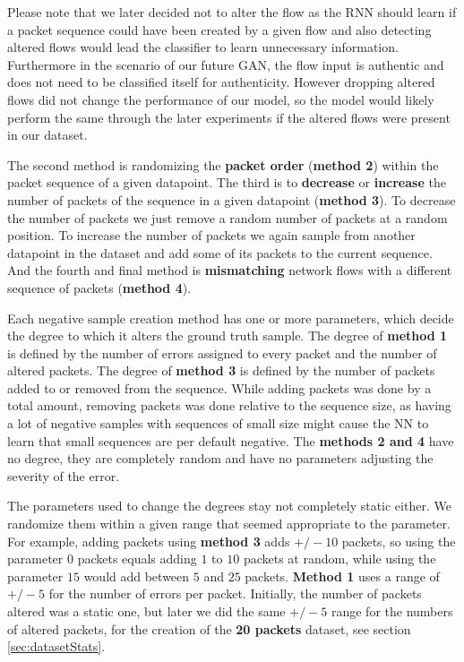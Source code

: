 \documentclass[
	ngerman,
	ruledheaders=section,%
	class=report,%
	thesis={type=bachelor},%
	accentcolor=9c,%
	custommargins=true,%
	marginpar=false,%
	parskip=half-,%
	fontsize=11pt,%
	twoside
]{tudapub}
\begin{document}
Please note that we later decided not to alter the flow as the RNN should learn if a packet sequence could have been created by a given flow and also detecting altered flows would lead the classifier to learn unnecessary information.
Furthermore in the scenario of our future GAN, the flow input is authentic and does not need to be classified itself for authenticity.
However dropping altered flows did not change the performance of our model, so the model would likely perform the same through the later experiments if the altered flows were present in our dataset.

The second method is randomizing the \textbf{packet order} (\textbf{method 2}) within the packet sequence of a given datapoint.
The third is to \textbf{decrease} or \textbf{increase} the number of packets of the sequence in a given datapoint (\textbf{method 3}).
To decrease the number of packets we just remove a random number of packets at a random position.
To increase the number of packets we again sample from another datapoint in the dataset and add some of its packets to the current sequence.
And the fourth and final method is \textbf{mismatching} network flows with a different sequence of packets (\textbf{method 4}).

Each negative sample creation method has one or more parameters, which decide the degree to which it alters the ground truth sample.
The degree of \textbf{method 1} is defined by the number of errors assigned to every packet and the number of altered packets.
The degree of \textbf{method 3} is defined by the number of packets added to or removed from the sequence.
While adding packets was done by a total amount, removing packets was done relative to the sequence size, as having a lot of negative samples with sequences of small size might cause the NN to learn that small sequences are per default negative.
The \textbf{methods 2 and 4} have no degree, they are completely random and have no parameters adjusting the severity of the error.

The parameters used to change the degrees stay not completely static either.
We randomize them within a given range that seemed appropriate to the parameter.
For example, adding packets using \textbf{method 3} adds $+/-10$ packets, so using the parameter $0$ packets equals adding $1$ to $10$ packets at random, while using the parameter $15$ would add between $5$ and $25$ packets.
\textbf{Method 1} uses a range of $+/-5$ for the number of errors per packet.
Initially, the number of packets altered was a static one, but later we did the same $+/-5$ range for the numbers of altered packets, for the creation of the \textbf{20 packets} dataset, see section \ref{sec:datasetStats}.
\end{document}
